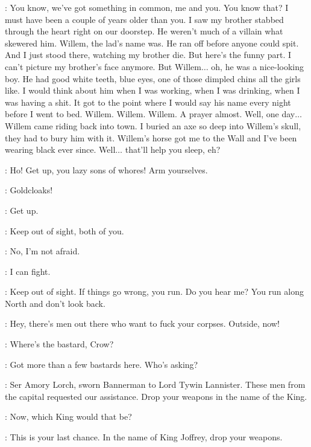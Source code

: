 \YOREN: You know, we've got something in common, me and you. You know that? I must have been a couple of years older than you. I saw my brother stabbed through the heart right on our doorstep. He weren't much of a villain what skewered him. Willem, the lad's name was. He ran off before anyone could spit. And I just stood there, watching my brother die. But here's the funny part. I can't picture my brother's face anymore. But Willem$\ldots$ oh, he was a nice-looking boy. He had good white teeth, blue eyes, one of those dimpled chins all the girls like. I would think about him when I was working, when I was drinking, when I was having a shit. It got to the point where I would say his name every night before I went to bed. Willem. Willem. Willem. A prayer almost. Well, one day$\ldots$ Willem came riding back into town. I buried an axe so deep into Willem's skull, they had to bury him with it. Willem's horse got me to the Wall and I've been wearing black ever since. Well$\ldots$ that'll help you sleep, eh? 


\YOREN: Ho! Get up, you lazy sons of whores! Arm yourselves. 

\GENDRY: Goldcloaks! 

\ARYA: Get up. 

\YOREN: Keep out of sight, both of you. 

\ARYA: No, I'm not afraid. 

\GENDRY: I can fight. 

\YOREN: Keep out of sight. If things go wrong, you run. Do you hear me? You run along North and don't look back. 


\YOREN: Hey, there's men out there who want to fuck your corpses. Outside, now! 


\AMORY: Where's the bastard, Crow? 

\YOREN: Got more than a few bastards here. Who's asking? 

\AMORY: Ser Amory Lorch, sworn Bannerman to Lord Tywin Lannister. These men from the capital requested our assistance. Drop your weapons in the name of the King. 

\YOREN: Now, which King would that be? 

\AMORY: This is your last chance. In the name of King Joffrey, drop your weapons. 

